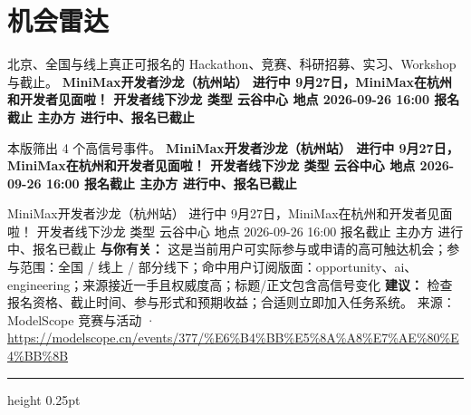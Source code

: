 \documentclass[10.5pt]{ctexart}
\begin{document}
\section*{机会雷达}
{\color{ormuted} 北京、全国与线上真正可报名的 Hackathon、竞赛、科研招募、实习、Workshop 与截止。}
\vspace{2mm}
{\LARGE\bfseries MiniMax开发者沙龙（杭州站） 进行中 9月27日，MiniMax在杭州和开发者见面啦！ 开发者线下沙龙 类型 云谷中心 地点 2026-09-26 16:00 报名截止 主办方 进行中、报名已截止}\par
\vspace{1mm}
{\color{ormuted} 本版筛出 4 个高信号事件。}
\vspace{3mm}
{\Large\bfseries MiniMax开发者沙龙（杭州站） 进行中 9月27日，MiniMax在杭州和开发者见面啦！ 开发者线下沙龙 类型 云谷中心 地点 2026-09-26 16:00 报名截止 主办方 进行中、报名已截止}\par
MiniMax开发者沙龙（杭州站） 进行中 9月27日，MiniMax在杭州和开发者见面啦！ 开发者线下沙龙 类型 云谷中心 地点 2026-09-26 16:00 报名截止 主办方 进行中、报名已截止
\textbf{与你有关：} 这是当前用户可实际参与或申请的高可触达机会；参与范围：全国 / 线上 / 部分线下；命中用户订阅版面：opportunity、ai、engineering；来源接近一手且权威度高；标题/正文包含高信号变化
\textbf{建议：} 检查报名资格、截止时间、参与形式和预期收益；合适则立即加入任务系统。
{\footnotesize\color{ormuted} 来源：ModelScope 竞赛与活动 · \url{https://modelscope.cn/events/377/%E6%B4%BB%E5%8A%A8%E7%AE%80%E4%BB%8B}}
\vspace{4mm}
\hrule height 0.25pt
\vspace{3mm}
\end{document}
